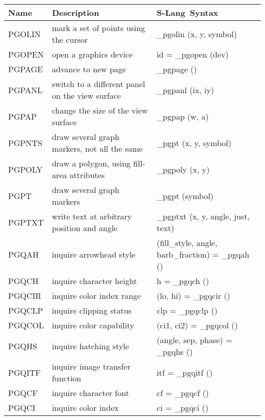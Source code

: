 \documentclass{book}
\newcommand{\slang}{{\sc S-Lang}}
\begin{document}
{\begin{center}
\begin{tabular}{|l|p{2.5in}|p{2.25in}|}
\hline
Name &  Description & \slang\ Syntax \\
\hline
\hline
PGOLIN & mark a set of points using the cursor               &
\_pgolin (x, y, symbol) \\
PGOPEN & open a graphics device                                            &
id = \_pgopen (dev) \\
PGPAGE & advance to new page                                            &
\_pgpage () \\
PGPANL & switch to a different panel on the view surface                &
\_pgpanl (ix, iy) \\
PGPAP & change the size of the view surface                             &
\_pgpap (w, a) \\
PGPNTS & draw several graph markers, not all the same         &
\_pgpt (x, y, symbol) \\
PGPOLY & draw a polygon, using fill-area attributes         &
\_pgpoly (x, y) \\
PGPT & draw several graph markers                                       &
\_pgpt (symbol) \\
PGPTXT & write text at arbitrary position and angle                     &
\_pgptxt (x, y, angle, just, text) \\
PGQAH & inquire arrowhead style          &
(fill\_style, angle, barb\_fraction) = \_pgqah () \\
PGQCH & inquire character height          &
h = \_pgqch () \\
PGQCIR & inquire color index range          &
(lo, hi) = \_pgqcir () \\
PGQCLP & inquire clipping status        &
clp = \_pgqclp () \\
PGQCOL & inquire color capability        &
(ci1, ci2) = \_pgqcol () \\
PGQHS & inquire hatching style        &
(angle, sep, phase) = \_pgqhs () \\
PGQITF & inquire image transfer function &
itf = \_pgqitf () \\
PGQCF & inquire character font                                             &
cf = \_pgqcf () \\
PGQCI & inquire color index                                             &
ci = \_pgqci () \\

\end{tabular}
\end{center}}
\end{document}

